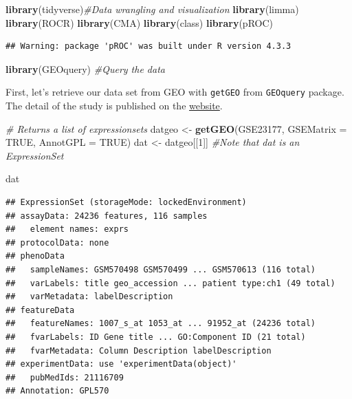 \documentclass[
]{article}
\newenvironment{Shaded}{\begin{snugshade}}{\end{snugshade}}
\newcommand{\AttributeTok}[1]{\textcolor[rgb]{0.13,0.29,0.53}{#1}}
\newcommand{\CommentTok}[1]{\textcolor[rgb]{0.56,0.35,0.01}{\textit{#1}}}
\newcommand{\ConstantTok}[1]{\textcolor[rgb]{0.56,0.35,0.01}{#1}}
\newcommand{\DecValTok}[1]{\textcolor[rgb]{0.00,0.00,0.81}{#1}}
\newcommand{\FunctionTok}[1]{\textcolor[rgb]{0.13,0.29,0.53}{\textbf{#1}}}
\newcommand{\NormalTok}[1]{#1}
\newcommand{\OtherTok}[1]{\textcolor[rgb]{0.56,0.35,0.01}{#1}}
\newcommand{\StringTok}[1]{\textcolor[rgb]{0.31,0.60,0.02}{#1}}
\begin{document}
\begin{Shaded}
\begin{Highlighting}[]
\FunctionTok{library}\NormalTok{(tidyverse)}\CommentTok{\#Data wrangling and visualization}
\FunctionTok{library}\NormalTok{(limma) }
\FunctionTok{library}\NormalTok{(ROCR)}
\FunctionTok{library}\NormalTok{(CMA)}
\FunctionTok{library}\NormalTok{(class) }
\FunctionTok{library}\NormalTok{(pROC)}
\end{Highlighting}
\end{Shaded}

\begin{verbatim}
## Warning: package 'pROC' was built under R version 4.3.3
\end{verbatim}

\begin{Shaded}
\begin{Highlighting}[]
\FunctionTok{library}\NormalTok{(GEOquery) }\CommentTok{\#Query the data }
\end{Highlighting}
\end{Shaded}

First, let's retrieve our data set from GEO with \texttt{getGEO} from
\texttt{GEOquery} package. The detail of the study is published on the
\href{comes\%20from\%20a\%20paper\%20by\%20Smeets\%20et\%20al.\%202010}{website}.

\begin{Shaded}
\begin{Highlighting}[]
\CommentTok{\# Returns a list of expressionsets}
\NormalTok{datgeo }\OtherTok{\textless{}{-}} \FunctionTok{getGEO}\NormalTok{(}\StringTok{\textquotesingle{}GSE23177\textquotesingle{}}\NormalTok{, }\AttributeTok{GSEMatrix =} \ConstantTok{TRUE}\NormalTok{, }\AttributeTok{AnnotGPL =} \ConstantTok{TRUE}\NormalTok{) }
\NormalTok{dat }\OtherTok{\textless{}{-}}\NormalTok{ datgeo[[}\DecValTok{1}\NormalTok{]]   }\CommentTok{\#Note that dat is an ExpressionSet}
\end{Highlighting}
\end{Shaded}

\begin{Shaded}
\begin{Highlighting}[]
\NormalTok{dat}
\end{Highlighting}
\end{Shaded}

\begin{verbatim}
## ExpressionSet (storageMode: lockedEnvironment)
## assayData: 24236 features, 116 samples 
##   element names: exprs 
## protocolData: none
## phenoData
##   sampleNames: GSM570498 GSM570499 ... GSM570613 (116 total)
##   varLabels: title geo_accession ... patient type:ch1 (49 total)
##   varMetadata: labelDescription
## featureData
##   featureNames: 1007_s_at 1053_at ... 91952_at (24236 total)
##   fvarLabels: ID Gene title ... GO:Component ID (21 total)
##   fvarMetadata: Column Description labelDescription
## experimentData: use 'experimentData(object)'
##   pubMedIds: 21116709 
## Annotation: GPL570
\end{verbatim}
\end{document}
